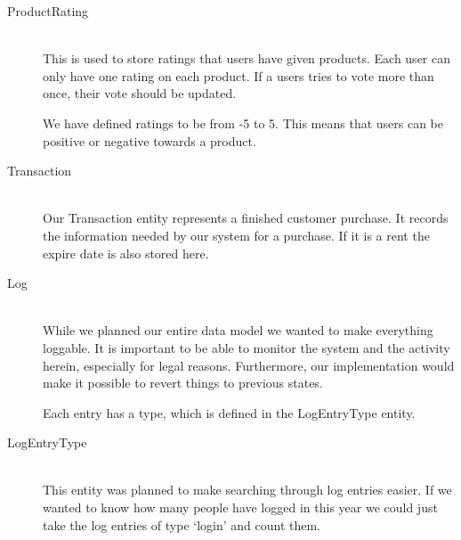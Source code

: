\begin{description}
\item[ProductRating] \hfill \\
This is used to store ratings that users have given products. Each user can only have one rating on each product. If a users tries to vote more than once, their vote should be updated.

We have defined ratings to be from -5 to 5. This means that users can be positive or negative towards a product.

\item[Transaction] \hfill \\
Our Transaction entity represents a finished customer purchase. It records the information needed by our system for a purchase. If it is a rent the expire date is also stored here.

\item[Log] \hfill \\
While we planned our entire data model we wanted to make everything loggable. It is important to be able to monitor the system and the activity herein, especially for legal reasons. Furthermore, our implementation would make it possible to revert things to previous states.

Each entry has a type, which is defined in the LogEntryType entity.

\item[LogEntryType] \hfill \\
This entity was planned to make searching through log entries easier. If we wanted to know how many people have logged in this year we could just take the log entries of type `login' and count them.
\end{description}
